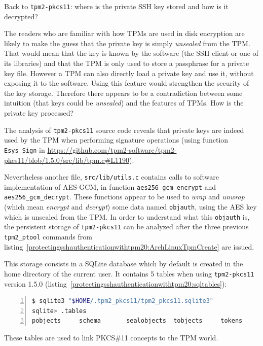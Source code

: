 Back to \texttt{tpm2-pkcs11}: where is the private SSH
key stored and how is it decrypted?

The readers who are familiar with how TPMs are used in disk encryption
are likely to make the guess that the private key is simply
\emph{unsealed} from the TPM. That would mean that the key is known by
the software (the SSH client or one of its libraries) and that the TPM
is only used to store a passphrase for a private key file. However a TPM
can also directly load a private key and use it, without exposing it to
the software. Using this feature would strengthen the security of the
key storage. Therefore there appears to be a contradiction between some
intuition (that keys could be \emph{unsealed}) and the features of TPMs.
How is the private key processed?

The analysis of \texttt{tpm2-pkcs11} source code
reveals that private keys are indeed used by the TPM when performing
signature operations (using function
\texttt{Esys\_Sign} in
\url{https://github.com/tpm2-software/tpm2-pkcs11/blob/1.5.0/src/lib/tpm.c\#L1190}).

Nevertheless another file, \texttt{src/lib/utils.c}
contains calls to software implementation of AES-GCM, in function
\texttt{aes256\_gcm\_encrypt} and
\texttt{aes256\_gcm\_decrypt}. These functions appear
to be used to \emph{wrap} and \emph{unwrap} (which mean \emph{encrypt}
and \emph{decrypt}) some data named \texttt{objauth},
using the AES key which is unsealed from the TPM. In order to understand
what this \texttt{objauth} is, the persistent storage
of \texttt{tpm2-pkcs11} can be analyzed after the three
previous \texttt{tpm2\_ptool} commands from
listing~\ref{protectingsshauthenticationwithtpm20:ArchLinuxTpmCreate} are
issued.

This storage consists in a SQLite database which by default is created
in the home directory of the current user. It contains 5 tables when
using \texttt{tpm2-pkcs11} version 1.5.0
(listing~\ref{protectingsshauthenticationwithtpm20:sqltables}):

\begin{lstlisting}[language=sh, numbers=left, caption={Tables in \texttt{tpm2-pkcs11} database}, label=protectingsshauthenticationwithtpm20:sqltables]
$ sqlite3 "$HOME/.tpm2_pkcs11/tpm2_pkcs11.sqlite3"
sqlite> .tables
pobjects     schema       sealobjects  tobjects     tokens
\end{lstlisting}

These tables are used to link PKCS\#11 concepts to the TPM world.

